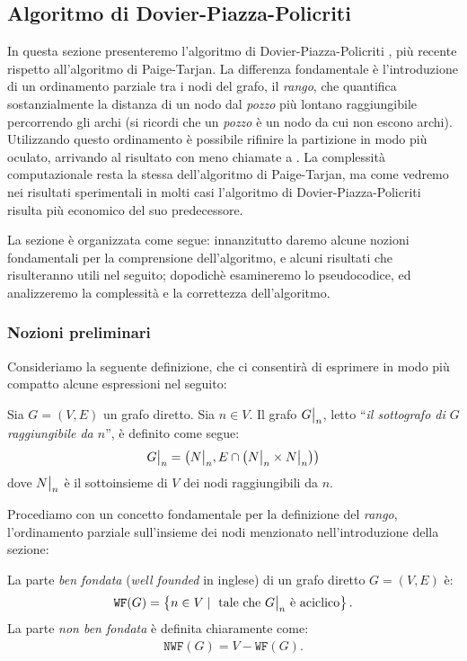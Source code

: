 \subsection{Algoritmo di Dovier-Piazza-Policriti}
\label{sec:dovier_piazza_policriti}
In questa sezione presenteremo l'algoritmo di Dovier-Piazza-Policriti \cite{dovier}, più recente rispetto all'algoritmo di Paige-Tarjan. La differenza fondamentale è l'introduzione di un ordinamento parziale tra i nodi del grafo, il \emph{rango}, che quantifica sostanzialmente la distanza di un nodo dal \emph{pozzo} più lontano raggiungibile percorrendo gli archi (si ricordi che un \emph{pozzo} è un nodo da cui non escono archi). Utilizzando questo ordinamento è possibile rifinire la partizione in modo più oculato, arrivando al risultato con meno chiamate a \splitfunc. La complessità computazionale resta la stessa dell'algoritmo di Paige-Tarjan, ma come vedremo nei risultati sperimentali in molti casi l'algoritmo di Dovier-Piazza-Policriti risulta più economico del suo predecessore.

La sezione è organizzata come segue: innanzitutto daremo alcune nozioni fondamentali per la comprensione dell'algoritmo, e alcuni risultati che risulteranno utili nel seguito; dopodichè esamineremo lo pseudocodice, ed analizzeremo la complessità e la correttezza dell'algoritmo.

\subsubsection{Nozioni preliminari}
\label{sec:fba_preliminari}
Consideriamo la seguente definizione, che ci consentirà di esprimere in modo più compatto alcune espressioni nel seguito:
\begin{definition}
    \label{def:grafo_restr}
    Sia $G = (V,E)$ un grafo diretto. Sia $n \in V$. Il grafo $\restr{G}{n}$, letto ``\emph{il sottografo di $G$ raggiungibile da $n$}'', è definito come segue:
    \begin{gather*}
        \restr{G}{n} = \left(\restr{N}{n}, E \cap \left(\restr{N}{n} \times \restr{N}{n}\right)\right)
    \end{gather*}
    dove $\restr{N}{n}$ è il sottoinsieme di $V$ dei nodi raggiungibili da $n$.
\end{definition}

Procediamo con un concetto fondamentale per la definizione del \emph{rango}, l'ordinamento parziale sull'insieme dei nodi menzionato nell'introduzione della sezione:
\begin{definition}
    La parte \emph{ben fondata} (\emph{well founded} in inglese) di un grafo diretto $G = (V,E)$ è:
    \begin{gather*}
        \texttt{WF}(G) = \left\{n \in V \mid \text{ tale che } \restr{G}{n} \text{ è aciclico}\right\}.
    \end{gather*}
    La parte \emph{non ben fondata} è definita chiaramente come:
    \begin{gather*}
        \texttt{NWF}(G) = V - \texttt{WF}(G).
    \end{gather*}
\end{definition}

